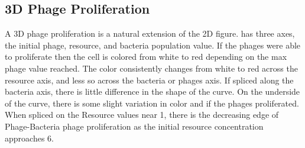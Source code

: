 \subsection{3D Phage Proliferation}
A 3D phage proliferation is a natural extension of the 2D figure. 
 has three axes, the initial phage, resource, and bacteria population value. 
If the phages were able to proliferate then the cell is colored from white to red depending on the max phage value reached. 
The color consistently changes from white to red across the resource axis, and less so across the bacteria or phages axis. 
If spliced along the bacteria axis, there is little difference in the shape of the curve. 
On the underside of the curve, there is some slight variation in color and if the phages proliferated. 
When spliced on the Resource values near 1, there is the decreasing edge of Phage-Bacteria phage proliferation as the initial resource concentration approaches 6. 

